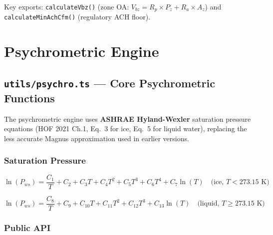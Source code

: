 \documentclass[12pt, a4paper, oneside]{report}
\newcommand{\file}[1]{\texttt{\textcolor{codeblue}{#1}}}
\newcommand{\code}[1]{\texttt{\textcolor{codered}{#1}}}
\begin{document}
Key exports: \code{calculateVbz()} (zone OA: $V_{bz} = R_p \times P_z + R_a \times A_z$) and \code{calculateMinAchCfm()} (regulatory ACH floor).


\chapter{Psychrometric Engine}

\section{\file{utils/psychro.ts} --- Core Psychrometric Functions}

The psychrometric engine uses \textbf{ASHRAE Hyland-Wexler} saturation pressure equations (HOF 2021 Ch.1, Eq.~3 for ice, Eq.~5 for liquid water), replacing the less accurate Magnus approximation used in earlier versions.

\subsection{Saturation Pressure}

\begin{equation}
  \ln(P_{ws}) = \frac{C_1}{T} + C_2 + C_3 T + C_4 T^2 + C_5 T^3 + C_6 T^4 + C_7 \ln(T) \quad \text{(ice, } T < 273.15\text{ K)}
\end{equation}

\begin{equation}
  \ln(P_{ws}) = \frac{C_8}{T} + C_9 + C_{10} T + C_{11} T^2 + C_{12} T^3 + C_{13} \ln(T) \quad \text{(liquid, } T \geq 273.15\text{ K)}
\end{equation}

\subsection{Public API}
\end{document}
